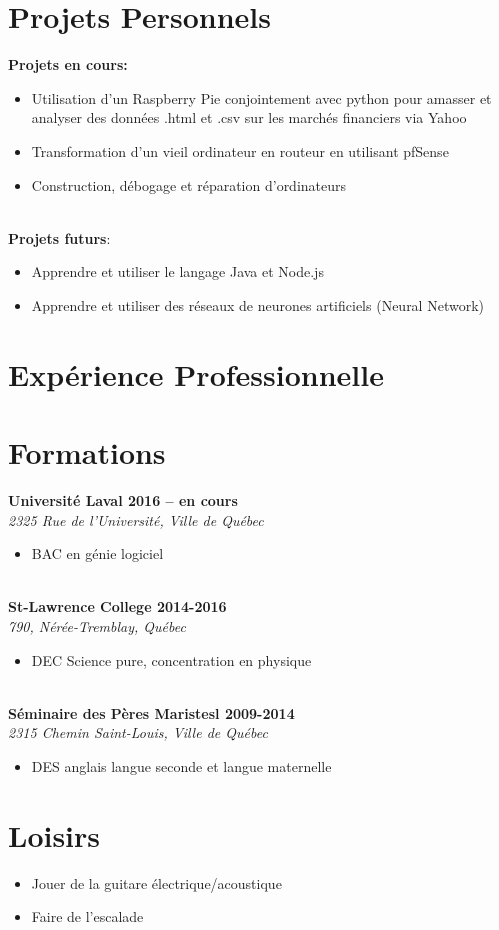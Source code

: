 \documentclass[11pt,a4paper,roman]{moderncv}        %
\begin{document}
\section {Projets Personnels}
{\bfseries Projets en cours:}
\begin{itemize}
\item Utilisation d’un Raspberry Pie conjointement avec python pour amasser et analyser des données .html et .csv sur les marchés financiers via Yahoo
\item Transformation d’un vieil ordinateur en routeur en utilisant pfSense
\item Construction, débogage et réparation d’ordinateurs
\end{itemize}
\hfill\\
{\bfseries Projets futurs}:
\begin{itemize}
\item Apprendre et utiliser le langage Java et Node.js
\item Apprendre et utiliser des réseaux de neurones artificiels (Neural Network)
\end{itemize}

\section{Expérience Professionnelle}

\section {Formations}
{\bfseries Université Laval \hfill 2016 – en cours}\\
\textit {2325 Rue de l'Université, Ville de Québec}
\begin{itemize} \item BAC en génie logiciel \end{itemize}
\hfill\\
{\bfseries St-Lawrence College \hfill 2014-2016}\\
\textit {790, Nérée-Tremblay, Québec}
\begin{itemize} \item DEC Science pure, concentration en physique \end{itemize}
\hfill\\
{\bfseries Séminaire des Pères Maristesl \hfill 2009-2014}\\
\textit {2315 Chemin Saint-Louis, Ville de Québec}
\begin{itemize} \item DES anglais langue seconde et langue maternelle \end{itemize}

\section{Loisirs}
\begin{itemize} 
\item Jouer de la guitare électrique/acoustique
\item Faire de l’escalade
\end{itemize}
\end{document}
